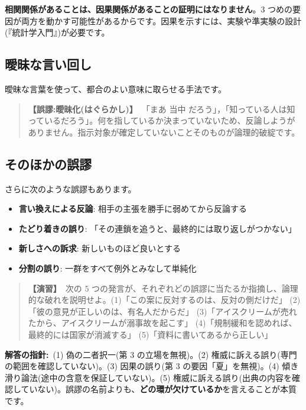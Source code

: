 \documentclass{article}
\begin{document}
\textbf{相関関係があることは、因果関係があることの証明にはなりません}。3 つめの要因が両方を動かす可能性があるからです。因果を示すには、実験や準実験の設計(『統計学入門』)が必要です。

\subsection{曖昧な言い回し}

曖昧な言葉を使って、都合のよい意味に取らせる手法です。

\begin{quote}
\textbf{【誤謬:曖昧化(はぐらかし)】}\  「まあ 当中 だろう」，「知っている人は知っているだろう」。何を指しているか決まっていないため、反論しようがありません。指示対象が確定していないことそのものが論理的破綻です。
\end{quote}

\subsection{そのほかの誤謬}

さらに次のような誤謬もあります。

\begin{itemize}
\item \textbf{言い換えによる反論}: 相手の主張を勝手に弱めてから反論する
\item \textbf{たどり着きの誤り}: 「その連鎖を追うと、最終的には取り返しがつかない」
\item \textbf{新しさへの訴求}: 新しいものほど良いとする
\item \textbf{分割の誤り}: 一群をすべて例外とみなして単純化
\end{itemize}

\begin{quote}
\textbf{【演習】}\ 次の 5 つの発言が、それぞれどの誤謬に当たるか指摘し、論理的な破れを説明せよ。(1)「この案に反対するのは、反対の側だけだ」 (2)「彼の意見が正しいのは、有名人だからだ」 (3)「アイスクリームが売れたから、アイスクリームが溺事故を起こす」 (4)「規制緩和を認めれば、最終的には国家が消滅する」 (5)「資料に書いてあるから正しい」
\end{quote}

\textbf{解答の指針:}\ (1) 偽の二者択一(第 3 の立場を無視)。(2) 権威に訴える誤り(専門の範囲を確認していない)。(3) 因果の誤り(第 3 の要因「夏」を無視)。(4) 傾き滑り論法(途中の含意を保証していない)。(5) 権威に訴える誤り(出典の内容を確認していない)。誤謬の名前よりも、\textbf{どの環が欠けているか}を言えることが本質です。
\end{document}
